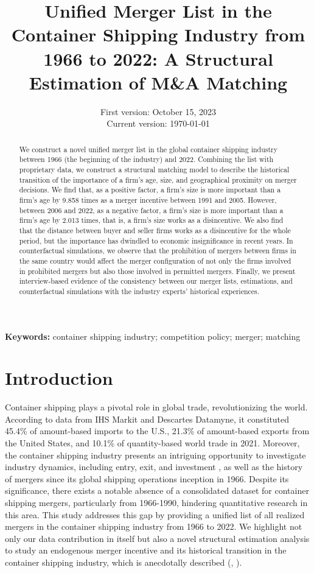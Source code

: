 \documentclass[10pt]{article}
\title{Unified Merger List in the Container Shipping Industry from 1966 to 2022: A Structural Estimation of M\&A Matching}
\date{
First version: October 15, 2023\\
Current version: \today
}
\begin{document}
\maketitle

\begin{abstract}
We construct a novel unified merger list in the global container shipping industry between 1966 (the beginning of the industry) and 2022. Combining the list with proprietary data, we construct a structural matching model to describe the historical transition of the importance of a firm's age, size, and geographical proximity on merger decisions. 
We find that, as a positive factor, a firm's size is more important than a firm's age by 9.858 times as a merger incentive between 1991 and 2005.
However, between 2006 and 2022, as a negative factor, a firm's size is more important than a firm's age by 2.013 times, that is, a firm's size works as a disincentive.
We also find that the distance between buyer and seller firms works as a disincentive for the whole period, but the importance has dwindled to economic insignificance in recent years. 
In counterfactual simulations, we observe that the prohibition of mergers between firms in the same country would affect the merger configuration of not only the firms involved in prohibited mergers but also those involved in permitted mergers.
Finally, we present interview-based evidence of the consistency between our merger lists, estimations, and counterfactual simulations with the industry experts' historical experiences.

\end{abstract} 

\vspace{0.1in}
\noindent\textbf{Keywords:} container shipping industry; competition policy; merger; matching 
\vspace{0in}


\section{Introduction}

Container shipping plays a pivotal role in global trade, revolutionizing the world. According to data from IHS Markit and Descartes Datamyne, it constituted 45.4\% of amount-based imports to the U.S., 21.3\% of amount-based exports from the United States, and 10.1\% of quantity-based world trade in 2021.
Moreover, the container shipping industry presents an intriguing opportunity to investigate industry dynamics, including entry, exit, and investment \citep{otani2023industry}, as well as the history of mergers since its global shipping operations inception in 1966.
Despite its significance, there exists a notable absence of a consolidated dataset for container shipping mergers, particularly from 1966-1990, hindering quantitative research in this area. 
This study addresses this gap by providing a unified list of all realized mergers in the container shipping industry from 1966 to 2022.
We highlight not only our data contribution in itself but also a novel structural estimation analysis to study an endogenous merger incentive and its historical transition in the container shipping industry, which is anecdotally described (\cite{broeze2002globalisation}, \cite{levinson2016box}).
\end{document}
